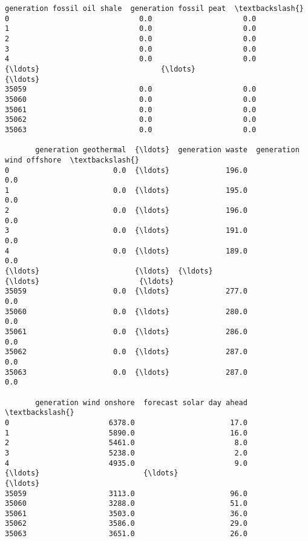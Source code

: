 \documentclass[11pt]{article}
\begin{document}
\begin{tcolorbox}[breakable, size=fbox, boxrule=.5pt, pad at break*=1mm, opacityfill=0]
\begin{Verbatim}[commandchars=\\\{\}]
       generation fossil oil shale  generation fossil peat  \textbackslash{}
0                              0.0                     0.0
1                              0.0                     0.0
2                              0.0                     0.0
3                              0.0                     0.0
4                              0.0                     0.0
{\ldots}                            {\ldots}                     {\ldots}
35059                          0.0                     0.0
35060                          0.0                     0.0
35061                          0.0                     0.0
35062                          0.0                     0.0
35063                          0.0                     0.0

       generation geothermal  {\ldots}  generation waste  generation wind offshore  \textbackslash{}
0                        0.0  {\ldots}             196.0                       0.0
1                        0.0  {\ldots}             195.0                       0.0
2                        0.0  {\ldots}             196.0                       0.0
3                        0.0  {\ldots}             191.0                       0.0
4                        0.0  {\ldots}             189.0                       0.0
{\ldots}                      {\ldots}  {\ldots}               {\ldots}                       {\ldots}
35059                    0.0  {\ldots}             277.0                       0.0
35060                    0.0  {\ldots}             280.0                       0.0
35061                    0.0  {\ldots}             286.0                       0.0
35062                    0.0  {\ldots}             287.0                       0.0
35063                    0.0  {\ldots}             287.0                       0.0

       generation wind onshore  forecast solar day ahead  \textbackslash{}
0                       6378.0                      17.0
1                       5890.0                      16.0
2                       5461.0                       8.0
3                       5238.0                       2.0
4                       4935.0                       9.0
{\ldots}                        {\ldots}                       {\ldots}
35059                   3113.0                      96.0
35060                   3288.0                      51.0
35061                   3503.0                      36.0
35062                   3586.0                      29.0
35063                   3651.0                      26.0


\end{Verbatim}
\end{tcolorbox}
\end{document}
